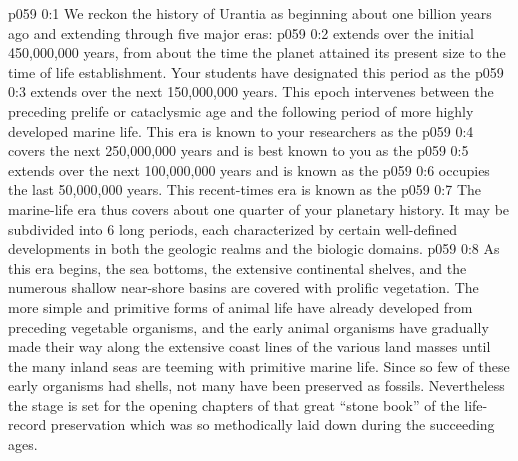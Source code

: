 \author{Life Carrier}
\vs p059 0:1 We reckon the history of Urantia as beginning about one billion years ago and extending through five major eras:
\vs p059 0:2 \bibnobreakspace {} extends over the initial 450,000,000 years, from about the time the planet attained its present size to the time of life establishment. Your students have designated this period as the 
\vs p059 0:3 \bibnobreakspace {} extends over the next 150,000,000 years. This epoch intervenes between the preceding prelife or cataclysmic age and the following period of more highly developed marine life. This era is known to your researchers as the 
\vs p059 0:4 \bibnobreakspace {} covers the next 250,000,000 years and is best known to you as the 
\vs p059 0:5 \bibnobreakspace {} extends over the next 100,000,000 years and is known as the 
\vs p059 0:6 \bibnobreakspace {} occupies the last 50,000,000 years. This recent\hyp{}times era is known as the 
\vs p059 0:7 \pc The marine\hyp{}life era thus covers about one quarter of your planetary history. It may be subdivided into 6 long periods, each characterized by certain well\hyp{}defined developments in both the geologic realms and the biologic domains.
\vs p059 0:8 As this era begins, the sea bottoms, the extensive continental shelves, and the numerous shallow near\hyp{}shore basins are covered with prolific vegetation. The more simple and primitive forms of animal life have already developed from preceding vegetable organisms, and the early animal organisms have gradually made their way along the extensive coast lines of the various land masses until the many inland seas are teeming with primitive marine life. Since so few of these early organisms had shells, not many have been preserved as fossils. Nevertheless the stage is set for the opening chapters of that great “stone book” of the life\hyp{}record preservation which was so methodically laid down during the succeeding ages.
